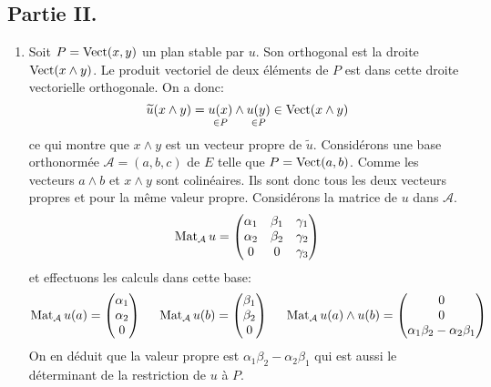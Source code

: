 \subsection*{Partie II.}
\begin{enumerate}
 \item Soit $P=\operatorname{Vect}(x,y)$ un plan stable par $u$. Son orthogonal est la droite $\operatorname{Vect}(x\wedge y)$. Le produit vectoriel de deux éléments de $P$ est dans cette droite vectorielle orthogonale. On a donc:
\begin{displaymath}
 \widetilde{u}(x\wedge y) = \underset{\in P}{u(x)}\wedge \underset{\in P}{u(y)}\in \operatorname{Vect}(x\wedge y)
\end{displaymath}
ce qui montre que $x\wedge y$ est un vecteur propre de $\widetilde{u}$.\newline
Considérons une base orthonormée $\mathcal{A}=(a,b,c)$ de $E$ telle que $P=\operatorname{Vect}(a,b)$. Comme les vecteurs $a\wedge b$ et $x\wedge y$ sont colinéaires. Ils sont donc tous les deux  vecteurs propres et pour la même valeur propre. Considérons la matrice de $u$ dans $\mathcal{A}$.
\begin{displaymath}
 \operatorname{Mat}_{\mathcal{A}}u =
\begin{pmatrix}
 \alpha_1 & \beta_1 & \gamma_1 \\
\alpha_2 & \beta_2 & \gamma_2 \\
0 & 0 & \gamma_3
\end{pmatrix}
\end{displaymath}
et effectuons les calculs dans cette base:
\begin{displaymath}
 \operatorname{Mat}_{\mathcal{A}}u(a)=
\begin{pmatrix}
 \alpha_1 \\ \alpha_2 \\  0
\end{pmatrix}
\hspace{0.5cm}
 \operatorname{Mat}_{\mathcal{A}}u(b)=
\begin{pmatrix}
 \beta_1 \\ \beta_2 \\ 0
\end{pmatrix}
\hspace{0.5cm}
 \operatorname{Mat}_{\mathcal{A}}u(a)\wedge u(b)=
\begin{pmatrix}
 0 \\ 0 \\ \alpha_1 \beta_2 - \alpha_2 \beta_1
\end{pmatrix}
\end{displaymath}
On en déduit que la valeur propre est $\alpha_1 \beta_2 - \alpha_2 \beta_1$ qui est aussi le déterminant de la restriction de $u$ à $P$.

\end{enumerate}
